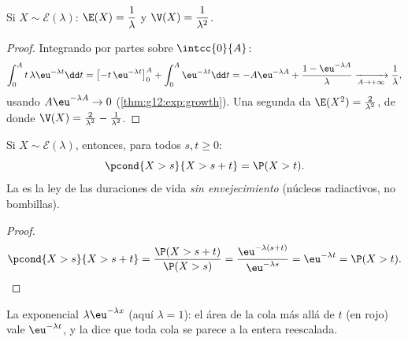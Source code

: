 \begin{proposition}\label{prop:g12:contdist:expomoments}
Si $X \sim \mathcal E(\lambda)$:
$\E(X) = \dfrac{1}{\lambda}$ y $\V(X) = \dfrac{1}{\lambda^2}$.
\end{proposition}

\begin{proof}
Integrando por partes sobre $\intcc{0}{A}$:
\[
\int_0^A t\,\lambda\eu^{-\lambda t}\dd t
= \bigl[-t\,\eu^{-\lambda t}\bigr]_0^A + \int_0^A \eu^{-\lambda t}\dd t
= -A\eu^{-\lambda A} + \frac{1 - \eu^{-\lambda A}}{\lambda}
\xrightarrow[A\to+\infty]{} \frac1\lambda,
\]
usando $A\eu^{-\lambda A} \to 0$ (\cref{thm:g12:exp:growth}). Una segunda
 da $\E(X^2) = \frac{2}{\lambda^2}$, de donde
$\V(X) = \frac{2}{\lambda^2} - \frac{1}{\lambda^2}$.
\end{proof}

\begin{theorem}\label{thm:g12:contdist:memoryless}
Si $X \sim \mathcal E(\lambda)$, entonces, para todos $s, t \geq 0$:
\[
\pcond{X > s}{X > s + t} = \P(X > t) .
\]
La  es la ley de las duraciones de vida \emph{sin
envejecimiento} (núcleos radiactivos, no bombillas).
\end{theorem}

\begin{proof}
\[
\pcond{X > s}{X > s+t}
= \frac{\P(X > s + t)}{\P(X > s)}
= \frac{\eu^{-\lambda(s+t)}}{\eu^{-\lambda s}} = \eu^{-\lambda t}
= \P(X > t). \qedhere
\]
\end{proof}

\begin{omfigure}

{\small La  exponencial $\lambda\eu^{-\lambda x}$ (aquí
$\lambda = 1$): el área de la cola más allá de $t$ (en rojo) vale
$\eu^{-\lambda t}$, y la  dice que toda cola se parece a la
 entera reescalada.}
\end{omfigure}

